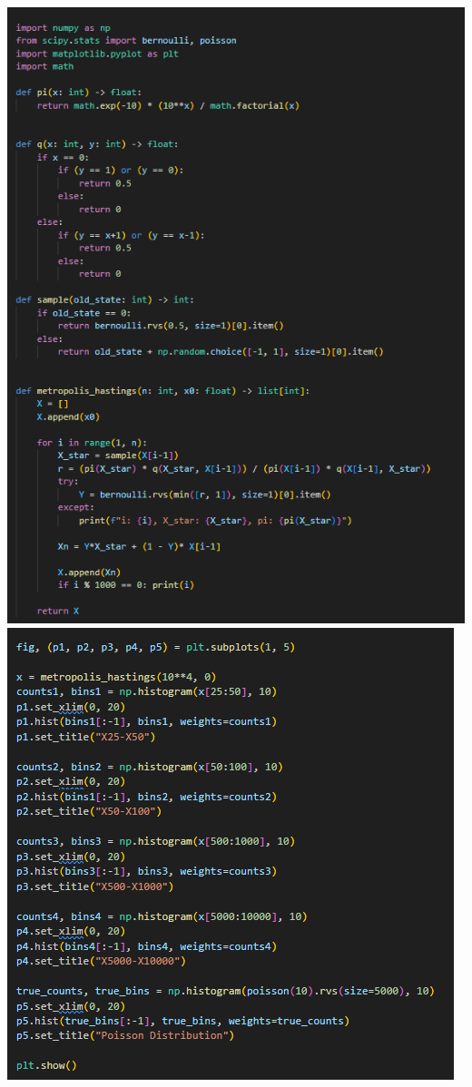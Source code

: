 \documentclass[11pt,letterpaper, leqno]{article}
\numberwithin{equation}{section}
\numberwithin{theorem}{section}
\numberwithin{lemma}{section}
\numberwithin{corollary}{section}
\numberwithin{definition}{section}
\numberwithin{proposition}{section}
\numberwithin{remark}{section}
\numberwithin{example}{section}
\begin{document}
\begin{enumerate}
\begin{center}
    \includegraphics[width=\textwidth]{Images/Code 1.png}
    \includegraphics[width=\textwidth]{Images/Code 2.png}


\end{center}
\end{enumerate}
\end{document}
